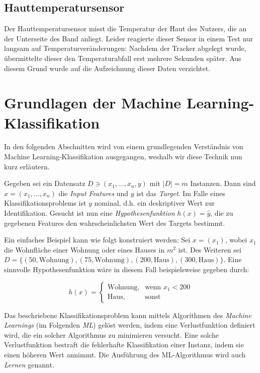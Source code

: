 \subsection{Hauttemperatursensor}
Der Hauttemperatursensor misst die Temperatur der Haut des Nutzers, die an der Unterseite des Band anliegt. Leider reagierte dieser Sensor in einem Test nur langsam auf Temperaturveränderungen: Nachdem der Tracker abgelegt wurde, übermittelte dieser den Temperaturabfall erst mehrere Sekunden später. Aus diesem Grund wurde auf die Aufzeichnung dieser Daten verzichtet.

\section{Grundlagen der Machine Learning-Klassifikation}
In den folgenden Abschnitten wird von einem grundlegenden Verständnis von Machine Learning-Klassifikation ausgegangen, weshalb wir diese Technik nun kurz erläutern. \\
\begin{definition}[ML-Klassifikation]
Gegeben sei ein Datensatz $D \ni (x_1, ..., x_n, y)$ mit $|D| = m$ Instanzen. Dann sind $x = (x_1, ..., x_n)$ die \textit{Input Features} und $y$ ist das \textit{Target}. Im Falle eines Klassifikationsproblems ist $y$ nominal, d.h. ein deskriptiver Wert zur Identifikation. Gesucht ist nun eine \textit{Hypothesenfunktion} $h(x) = \hat{y}$, die zu gegebenen Features den wahrscheinlichsten Wert des Targets bestimmt\cite{Ng2011a}.
\end{definition}\label{def:ml-classification}

Ein einfaches Beispiel kann wie folgt konstruiert werden: Sei $x = (x_1)$, wobei $x_1$ die Wohnfläche einer Wohnung oder eines Hauses in $m^2$ ist. Des Weiteren sei $D = \{(50, \text{Wohnung}), (75, \text{Wohnung}), (200, \text{Haus}), (300, \text{Haus})\}$. Eine sinnvolle Hypothesenfunktion wäre in diesem Fall beispielsweise gegeben durch:

\[
h(x) = 
\begin{cases}
\text{Wohnung}, & \text{wenn } x_1 < 200 \\
\text{Haus}, & \text{sonst}
\end{cases}
\]

Das beschriebene Klassifikationsproblem kann mittels Algorithmen des \textit{Machine Learnings} (im Folgenden \textit{ML}) gelöst werden, indem eine Verlustfunktion definiert wird, die ein solcher Algorithmus zu minimieren versucht. Eine solche Verlustfunktion bestraft die fehlerhafte Klassifikation einer Instanz, indem sie einen höheren Wert annimmt. Die Ausführung des ML-Algorithmus wird auch \textit{Lernen} genannt.

